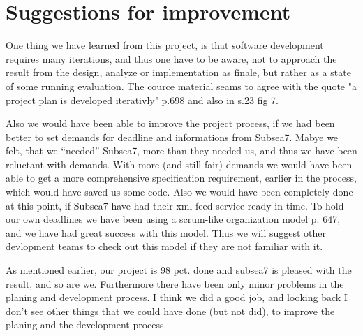 \section{Suggestions for improvement}
    One thing we have learned from this project, is that software development
    requires many iterations, and thus one have to be aware, not to approach
    the result from the design, analyze or implementation as finale, but rather
    as a state of some running evaluation. The cource material seams to agree
    with the quote "a project plan is developed iterativly"\cite{oose} p.698
    and also in \cite{mad-article} s.23 fig 7.

    Also we would have been able to improve the project process, if we had been
    better to set demands for deadline and informations from Subsea7. Mabye we
    felt, that we ``needed'' Subsea7, more than they needed us, and thus we
    have been reluctant with demands. With more (and still fair) demands we
    would have been able to get a more comprehensive specification requirement,
    earlier in the process, which would have saved us some code. Also we would
    have been completely done at this point, if Subsea7 have had their xml-feed
    service ready in time. To hold our own deadlines we have been using a
    scrum-like organization model \cite{oose} p. 647, and we have had great
    success with this model. Thus we will suggest other devlopment teams to
    check out this model if they are not familiar with it.

    As mentioned earlier, our project is 98 pct. done and subsea7 is pleased
    with the result, and so are we. Furthermore there have been only minor
    problems in the planing and development process. I think we did a good job,
    and looking back I don't see other things that we could have done (but not
    did), to improve the planing and the development process.
